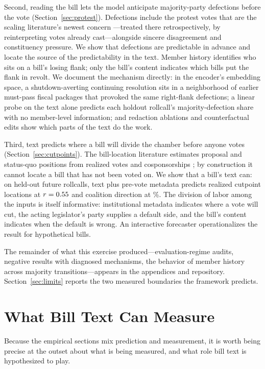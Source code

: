 \documentclass[12pt]{article}
\begin{document}
Second, reading the bill lets the model anticipate majority-party
defections before the vote (Section~\ref{sec:protest}). Defections
include the protest votes that are the scaling literature's newest
concern \citep{fowler2026protest}---treated there retrospectively, by
reinterpreting votes already cast---alongside sincere disagreement
and constituency pressure. We show that defections are predictable in
advance and locate the source of the predictability in the text.
Member history identifies who sits on a bill's losing flank; only the
bill's content indicates which bills put the flank in revolt. We
document the mechanism directly: in the encoder's embedding space, a
shutdown-averting continuing resolution sits in a neighborhood of
earlier must-pass fiscal packages that provoked the same right-flank
defections; a linear probe on the text alone predicts each holdout
rollcall's majority-defection share with no member-level information;
and redaction ablations and counterfactual edits show which parts of
the text do the work.

Third, text predicts where a bill will divide the chamber before
anyone votes (Section~\ref{sec:cutpoints}). The bill-location
literature estimates proposal and status-quo positions from realized
votes and cosponsorships \citep{peress2013estimating,
richman2011parties}; by construction it cannot locate a bill that has
not been voted on. We show that a bill's text can: on held-out future
rollcalls, text plus pre-vote metadata predicts realized cutpoint
locations at $r = 0.55$ and coalition direction at \dirCombo\%.
The division of labor among the inputs is itself informative:
institutional metadata indicates where a vote will cut, the acting
legislator's party supplies a default side, and the bill's content
indicates when the default is wrong. An interactive forecaster
operationalizes the result for hypothetical bills.

The remainder of what this exercise produced---evaluation-regime
audits, negative results with diagnosed mechanisms, the behavior of
member history across majority transitions---appears in the
appendices and repository. Section~\ref{sec:limits} reports the two
measured boundaries the framework predicts.

\section{What Bill Text Can Measure}
\label{sec:theory}

Because the empirical sections mix prediction and measurement, it is
worth being precise at the outset about what is being measured, and
what role bill text is hypothesized to play.
\end{document}

